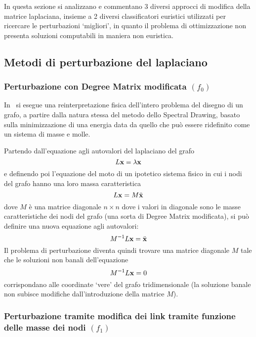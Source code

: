 \documentclass[10pt,a4paper]{article}
\begin{document}
In questa sezione si analizzano e commentano 3 diversi approcci di modifica della matrice laplaciana, insieme a 2 diversi classificatori euristici utilizzati per ricercare le perturbazioni `migliori', in quanto il problema di ottimizzazione non presenta soluzioni computabili in maniera non euristica.

\subsection{Metodi di perturbazione del laplaciano}

\subsubsection{Perturbazione con Degree Matrix modificata \((f_0)\)}\label{subsec:sofia}

In~\cite{tesi_sofia_farina} si esegue una reinterpretazione fisica dell'intero problema del disegno di un grafo, a partire dalla natura stessa del metodo dello Spectral Drawing, basato sulla minimizzazione di una energia data da quello che può essere ridefinito come un sistema di masse e molle.

Partendo dall'equazione agli autovalori del laplaciano del grafo
\begin{equation}
    L\vb{x} = \lambda\vb{x}
\end{equation}
e definendo poi l'equazione del moto di un ipotetico sistema fisico in cui i nodi del grafo hanno una loro massa caratteristica
\begin{equation}
    L\vb{x} = M \ddot{\vb{x}}
\end{equation}
dove \(M\) è una matrice diagonale \(n\times n\) dove i valori in diagonale sono le masse caratteristiche dei nodi del grafo (una sorta di Degree Matrix modificata), si può definire una nuova equazione agli autovalori:
\begin{equation}
    M^{-1}L\vb{x} = \ddot{\vb{x}}
\end{equation}
Il problema di perturbazione diventa quindi trovare una matrice diagonale \(M\) tale che le soluzioni non banali dell'equazione
\begin{equation}
    M^{-1}L\vb{x} = 0
\end{equation}
corrispondano alle coordinate `vere' del grafo tridimensionale (la soluzione banale non subisce modifiche dall'introduzione della matrice \(M\)).

\subsubsection{Perturbazione tramite modifica dei link tramite funzione delle masse dei nodi \((f_1)\)}
\end{document}
